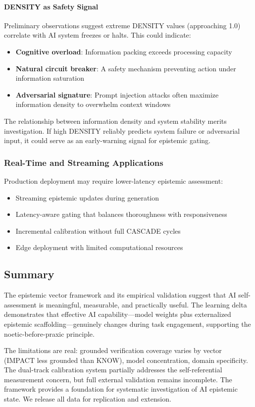 \paragraph{DENSITY as Safety Signal}

Preliminary observations suggest extreme DENSITY values (approaching 1.0) correlate with AI system freezes or halts. This could indicate:

\begin{itemize}
    \item \textbf{Cognitive overload}: Information packing exceeds processing capacity
    \item \textbf{Natural circuit breaker}: A safety mechanism preventing action under information saturation
    \item \textbf{Adversarial signature}: Prompt injection attacks often maximize information density to overwhelm context windows
\end{itemize}

The relationship between information density and system stability merits investigation. If high DENSITY reliably predicts system failure or adversarial input, it could serve as an early-warning signal for epistemic gating.

\subsubsection{Real-Time and Streaming Applications}

Production deployment may require lower-latency epistemic assessment:

\begin{itemize}
    \item Streaming epistemic updates during generation
    \item Latency-aware gating that balances thoroughness with responsiveness
    \item Incremental calibration without full CASCADE cycles
    \item Edge deployment with limited computational resources
\end{itemize}

\subsection{Summary}

The epistemic vector framework and its empirical validation suggest that AI self-assessment is meaningful, measurable, and practically useful. The learning delta demonstrates that effective AI capability---model weights plus externalized epistemic scaffolding---genuinely changes during task engagement, supporting the noetic-before-praxic principle.

The limitations are real: grounded verification coverage varies by vector (IMPACT less grounded than KNOW), model concentration, domain specificity. The dual-track calibration system partially addresses the self-referential measurement concern, but full external validation remains incomplete. The framework provides a foundation for systematic investigation of AI epistemic state. We release all data for replication and extension.
